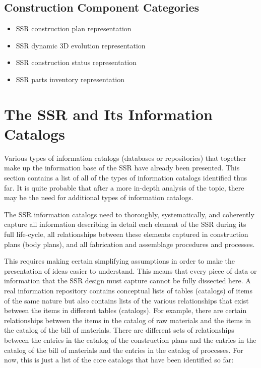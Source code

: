 \subsection{Construction Component Categories}
\begin{itemize}
\item SSR construction plan representation
\item SSR dynamic 3D evolution representation
\item SSR construction status representation
\item SSR parts inventory representation
\end{itemize}

\section{The SSR and Its Information Catalogs}

Various types of information catalogs (databases
or repositories) that together make up the information base of the SSR have already been presented.
This section contains a list of all of the types of information catalogs
identified thus far. It is quite probable that after a more in-depth analysis of the topic, there may be the need for additional types of information catalogs.

The SSR information catalogs need to thoroughly, systematically, and coherently capture 
all information describing in detail each element of the SSR during its
full life-cycle, all relationships between these elements captured in
construction plans (body plans), and all fabrication and assemblage
procedures and processes.

This requires making certain simplifying assumptions in order to make the presentation of ideas easier to understand. This means that every piece of data or information that the SSR design must capture cannot be fully dissected here.
A real information repository contains
conceptual lists of tables (catalogs) of items of the same nature but
also contains lists of the various relationships that exist between the
items in different tables (catalogs).  For example, there are certain
relationships between the items in the catalog of raw materials and the
items in the catalog of the bill of materials. There are
different sets of relationships between the entries in the catalog of
the construction plans and the entries in the catalog of the bill of
materials and the entries in the catalog of processes.  For now, this
is just a list of the core catalogs that have been identified so far:

